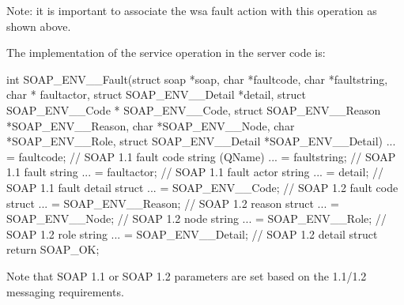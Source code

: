 Note: it is important to associate the wsa fault action with this operation as shown above.

The implementation of the service operation in the server code is:


\begin{DoxyCode}
int SOAP_ENV__Fault(struct soap *soap, char *faultcode, char *faultstring, char *
      faultactor, struct SOAP_ENV__Detail *detail, struct SOAP_ENV__Code *
      SOAP_ENV__Code, struct SOAP_ENV__Reason *SOAP_ENV__Reason, char *SOAP_ENV__Node, 
      char *SOAP_ENV__Role, struct SOAP_ENV__Detail *SOAP_ENV__Detail)
{ 
  ... = faultcode; // SOAP 1.1 fault code string (QName)
  ... = faultstring; // SOAP 1.1 fault string
  ... = faultactor; // SOAP 1.1 fault actor string
  ... = detail; // SOAP 1.1 fault detail struct
  ... = SOAP_ENV__Code; // SOAP 1.2 fault code struct
  ... = SOAP_ENV__Reason; // SOAP 1.2 reason struct
  ... = SOAP_ENV__Node; // SOAP 1.2 node string
  ... = SOAP_ENV__Role; // SOAP 1.2 role string
  ... = SOAP_ENV__Detail; // SOAP 1.2 detail struct
  return SOAP_OK;
}
\end{DoxyCode}


Note that SOAP 1.1 or SOAP 1.2 parameters are set based on the 1.1/1.2 messaging requirements. 